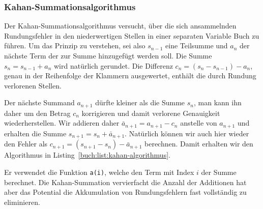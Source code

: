 \subsubsection{Kahan-Summationsalgorithmus}
Der Kahan-Summationsalgorithmus versucht, über die sich ansammelnden
%
Rundungsfehler in den niederwertigen Stellen in einer separaten 
Variable Buch zu führen.
Um das Prinzip zu verstehen, sei also $s_{n-1}$ eine Teilsumme und $a_n$ der
nächste Term der zur Summe hinzugefügt werden soll. 
Die Summe $s_n=s_{n-1} + a_n$ wird natürlich gerundet.
Die Differenz $c_n = (s_n - s_{n-1}) - a_n$, genau in der Reihenfolge
der Klammern ausgewertet, enthält die durch Rundung verlorenen Stellen.

Der nächste Summand $a_{n+1}$ dürfte kleiner als die Summe $s_{n}$, 
man kann ihn daher um den Betrag $c_n$ korrigieren und damit verlorene
Genauigkeit wiederherstellen.
Wir addieren daher $\bar a_{n+1} = a_{n+1}-c_n$ anstelle von $a_{n+1}$
und erhalten die Summe $s_{n+1} = s_n + \bar{a}_{n+1}$.
Natürlich können wir auch hier wieder den Fehler als
$c_{n+1} = (s_{n+1} - s_{n}) - \bar{a}_{n+1}$ berechnen.
Damit erhalten wir den Algorithmus in
Listing~\ref{buch:list:kahan-algorithmus}.

Er verwendet die Funktion \texttt{a(i)}, welche den Term mit Index $i$
der Summe berechnet.
Die Kahan-Summation vervierfacht die Anzahl der Additionen hat aber das
Potential die Akkumulation von Rundungsfehlern fast vollständig zu 
eliminieren.
%

